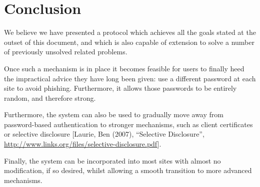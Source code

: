 \documentclass[a4paper,titlepage]{article}
\begin{document}
\section{Conclusion}

We believe we have presented a protocol which achieves all the goals
stated at the outset of this document, and which is also capable of
extension to solve a number of previously unsolved related problems.

Once such a mechanism is in place it becomes feasible for users to
finally heed the impractical advice they have long been given: use a
different password at each site to avoid phishing. Furthermore, it
allows those passwords to be entirely random, and therefore strong.

Furthermore, the system can also be used to gradually move away from
password-based authentication to stronger mechanisms, such as client
certificates or selective disclosure [Laurie, Ben (2007), ``Selective
  Disclosure'', \url{http://www.links.org/files/selective-disclosure.pdf}].

Finally, the system can be incorporated into most sites with almost no
modification, if so desired, whilst allowing a smooth transition to
more advanced mechanisms.
\end{document}
